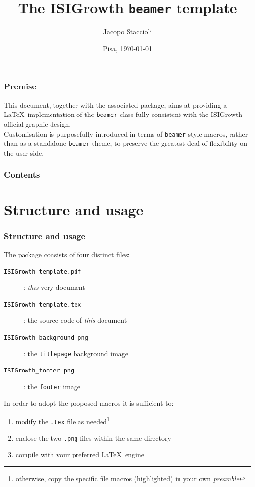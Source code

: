 \documentclass[english]{beamer}
\title[The ISIGrowth \texttt{beamer} template]{The ISIGrowth \texttt{beamer} template}
\author[Jacopo Staccioli]{Jacopo Staccioli}
\institute{\href{mailto:j.staccioli@santannapisa.it}{\texttt{j.staccioli<at>santannapisa.it}}}
\date[\today]{Pisa, \today}
\begin{document}
\begin{frame}
\vspace{5ex} %
\titlepage
\end{frame}

\begin{frame}
\frametitle{Premise}
This document, together with the associated package, aims at providing a \LaTeX\ implementation of the \texttt{beamer} class fully consistent with the ISIGrowth official graphic design.\\
\bigskip
Customisation is purposefully introduced in terms of \texttt{beamer} style macros, rather than as a standalone \texttt{beamer} theme, to preserve the greatest deal of flexibility on the user side.
\end{frame}

\begin{frame}
\frametitle{Contents}
\tableofcontents
\end{frame}

\section{Structure and usage}

\begin{frame}
\frametitle{Structure and usage}
The package consists of four distinct files:
\begin{description}
\item[\texttt{ISIGrowth\_template.pdf}]: \emph{this} very document
\item[\texttt{ISIGrowth\_template.tex}]: the source code of \emph{this} document
\item[\texttt{ISIGrowth\_background.png}]: the \texttt{titlepage} background image
\item[\texttt{ISIGrowth\_footer.png}]: the \texttt{footer} image
\end{description}
\bigskip
In order to adopt the proposed macros it is sufficient to:
\begin{enumerate}
\item modify the \texttt{.tex} file as needed\footnote{otherwise, copy the specific file macros (highlighted) in your own \emph{preamble}}
\item enclose the two \texttt{.png} files within the same directory
\item compile with your preferred \LaTeX\ engine
\end{enumerate}
\end{frame}
\end{document}
